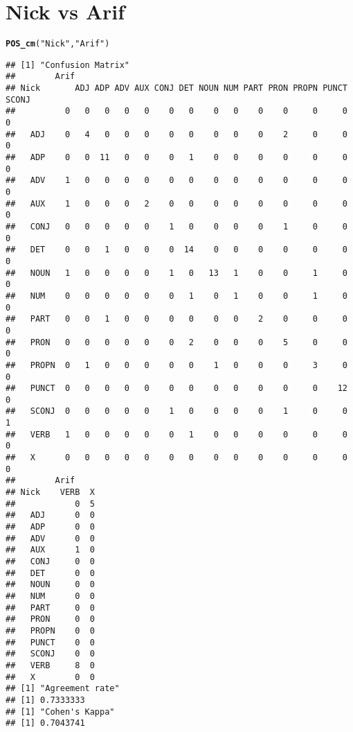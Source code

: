 \documentclass{article}\usepackage[]{graphicx}\usepackage[]{color}
\makeatletter
\newcommand{\hlstr}[1]{\textcolor[rgb]{0.192,0.494,0.8}{#1}}%
\newcommand{\hlstd}[1]{\textcolor[rgb]{0.345,0.345,0.345}{#1}}%
\newcommand{\hlkwd}[1]{\textcolor[rgb]{0.737,0.353,0.396}{\textbf{#1}}}%
\newenvironment{kframe}{%
 \def\at@end@of@kframe{}%
 \ifinner\ifhmode%
  \def\at@end@of@kframe{\end{minipage}}%
  \begin{minipage}{\columnwidth}%
 \fi\fi%
 \def\FrameCommand##1{\hskip\@totalleftmargin \hskip-\fboxsep
 \colorbox{shadecolor}{##1}\hskip-\fboxsep
     \hskip-\linewidth \hskip-\@totalleftmargin \hskip\columnwidth}%
 \MakeFramed {\advance\hsize-\width
   \@totalleftmargin\z@ \linewidth\hsize
   \@setminipage}}%
 {\par\unskip\endMakeFramed%
 \at@end@of@kframe}
\newenvironment{knitrout}{}{} %
\makeatother
\begin{document}
\section*{Nick vs Arif}
\begin{knitrout}
\color{fgcolor}\begin{kframe}
\begin{alltt}
\hlkwd{POS_cm}\hlstd{(}\hlstr{"Nick"}\hlstd{,} \hlstr{"Arif"}\hlstd{)}
\end{alltt}
\begin{verbatim}
## [1] "Confusion Matrix"
##        Arif
## Nick       ADJ ADP ADV AUX CONJ DET NOUN NUM PART PRON PROPN PUNCT SCONJ
##          0   0   0   0   0    0   0    0   0    0    0     0     0     0
##   ADJ    0   4   0   0   0    0   0    0   0    0    2     0     0     0
##   ADP    0   0  11   0   0    0   1    0   0    0    0     0     0     0
##   ADV    1   0   0   0   0    0   0    0   0    0    0     0     0     0
##   AUX    1   0   0   0   2    0   0    0   0    0    0     0     0     0
##   CONJ   0   0   0   0   0    1   0    0   0    0    1     0     0     0
##   DET    0   0   1   0   0    0  14    0   0    0    0     0     0     0
##   NOUN   1   0   0   0   0    1   0   13   1    0    0     1     0     0
##   NUM    0   0   0   0   0    0   1    0   1    0    0     1     0     0
##   PART   0   0   1   0   0    0   0    0   0    2    0     0     0     0
##   PRON   0   0   0   0   0    0   2    0   0    0    5     0     0     0
##   PROPN  0   1   0   0   0    0   0    1   0    0    0     3     0     0
##   PUNCT  0   0   0   0   0    0   0    0   0    0    0     0    12     0
##   SCONJ  0   0   0   0   0    1   0    0   0    0    1     0     0     1
##   VERB   1   0   0   0   0    0   1    0   0    0    0     0     0     0
##   X      0   0   0   0   0    0   0    0   0    0    0     0     0     0
##        Arif
## Nick    VERB  X
##            0  5
##   ADJ      0  0
##   ADP      0  0
##   ADV      0  0
##   AUX      1  0
##   CONJ     0  0
##   DET      0  0
##   NOUN     0  0
##   NUM      0  0
##   PART     0  0
##   PRON     0  0
##   PROPN    0  0
##   PUNCT    0  0
##   SCONJ    0  0
##   VERB     8  0
##   X        0  0
## [1] "Agreement rate"
## [1] 0.7333333
## [1] "Cohen's Kappa"
## [1] 0.7043741
\end{verbatim}
\end{kframe}
\end{knitrout}
\end{document}
